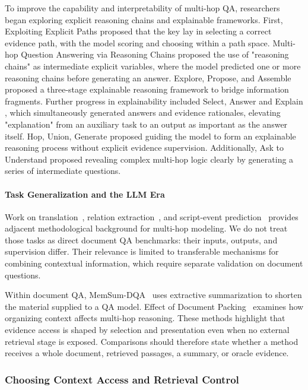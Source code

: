 To improve the capability and interpretability of multi-hop QA, researchers began exploring explicit reasoning chains and explainable frameworks. First, Exploiting Explicit Paths \cite{explicitpaths2019} proposed that the key lay in selecting a correct evidence path, with the model scoring and choosing within a path space. Multi-hop Question Answering via Reasoning Chains \cite{reasoningchains2020} proposed the use of "reasoning chains" as intermediate explicit variables, where the model predicted one or more reasoning chains before generating an answer. Explore, Propose, and Assemble \cite{epa2019} proposed a three-stage explainable reasoning framework to bridge information fragments. Further progress in explainability included Select, Answer and Explain \cite{sae2020}, which simultaneously generated answers and evidence rationales, elevating "explanation" from an auxiliary task to an output as important as the answer itself. Hop, Union, Generate \cite{hug2023} proposed guiding the model to form an explainable reasoning process without explicit evidence supervision. Additionally, Ask to Understand \cite{asktounderstand2023} proposed revealing complex multi-hop logic clearly by generating a series of intermediate questions.

\paragraph{Task Generalization and the LLM Era}
Work on translation~\cite{multihoptransformer2021}, relation extraction~\cite{syntaxmultihop2024}, and script-event prediction~\cite{docscript2024} provides adjacent methodological background for multi-hop modeling. We do not treat those tasks as direct document QA benchmarks: their inputs, outputs, and supervision differ. Their relevance is limited to transferable mechanisms for combining contextual information, which require separate validation on document questions.

Within document QA, MemSum-DQA~\cite{memsumdqa2023} uses extractive summarization to shorten the material supplied to a QA model. Effect of Document Packing~\cite{documentpacking2025} examines how organizing context affects multi-hop reasoning. These methods highlight that evidence access is shaped by selection and presentation even when no external retrieval stage is exposed. Comparisons should therefore state whether a method receives a whole document, retrieved passages, a summary, or oracle evidence.

\subsubsection{Choosing Context Access and Retrieval Control}

